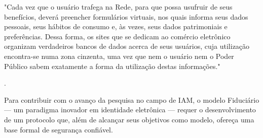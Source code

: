 \begin{citacao}
    "Cada  vez  que  o  usuário  trafega  na  Rede,  para  que  possa usufruir de seus benefícios, deverá preencher formulários virtuais, nos quais informa seus dados pessoais,  seus  hábitos  de  consumo  e,  às  vezes,  seus  dados  patrimoniais  e  preferências.  Dessa forma,  os sites que  se  dedicam  ao  comércio  eletrônico  organizam  verdadeiros  bancos  de  dados acerca  de  seus  usuários,  cuja  utilização  encontra-se  numa  zona  cinzenta,  uma  vez  que  nem  o usuário nem o Poder Público sabem exatamente a forma da utilização destas informações."
\end{citacao}.

Para contribuir com o avanço da pesquisa no campo de \acs{IAM}, o modelo Fiduciário — um paradigma inovador em identidade eletrônica — requer o desenvolvimento de um protocolo que, além de alcançar seus objetivos como modelo, ofereça uma base formal de segurança confiável.
